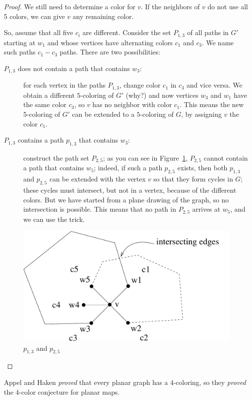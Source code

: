 \begin{proof}
We still need to determine a color for $v$. If the neighbors of $v$ do
not use all 5 colors, we can give $v$ any remaining color.

So, assume that all five $c_{i}$ are different. Consider the set
$P_{1,3}$ of all paths in $G'$ starting at $w_{1}$ and whose vertices
have alternating colors $c_{1}$ and $c_{3}$. We name such paths
$c_{1}-c_{3}$ paths.  There are two possibilities:

\begin{description}
\item[$P_{1,3}$ does not contain a path that contains $w_{3}$:]
  for each vertex in the paths $P_{1,3}$, change color $c_{1}$ in
  $c_{3}$ and vice versa. We obtain a different $5$-coloring of $G'$
  (why?) and now vertices $w_{3}$ and $w_{1}$ have the same color
  $c_{3}$, so $v$ has no neighbor with color $c_{1}$. This means the
  new 5-coloring of $G'$ can be extended to a $5$-coloring of $G$, by
  assigning $v$ the color $c_{1}$.

\item[$P_{1,3}$ contains a path $p_{1,3}$ that contains $w_{3}$:]
  construct the path set $P_{2,5}$; as you can see in
  Figure~\ref{5kleuring3}, $P_{2,5}$ cannot contain a path that
  contains $w_{5}$; indeed, if such a path $p_{2,5}$ exists, then both
  $p_{1,3}$ and $p_{2,5}$ can be extended with the vertex $v$ so that
  they form cycles in $G$; these cycles must intersect, but not in a
  vertex, because of the different colors. But we have started from a
  plane drawing of the graph, so no intersection is possible. This
  means that no path in $P_{2,5}$ arrives at $w_{5}$, and we can use
  the trick.
\end{description}

\begin{figure}[ht]
\begin{center}
\includegraphics[width=0.4\linewidth,keepaspectratio]{5kleuring3eng}
\end{center}
\caption{$p_{1,3}$ and $p_{2,5}$ \label{5kleuring3}}
\end{figure}
\end{proof}

Appel and Haken {\em proved} that every planar graph has a
$4$-coloring, so they {\em proved} the 4-color conjecture for planar
maps.

